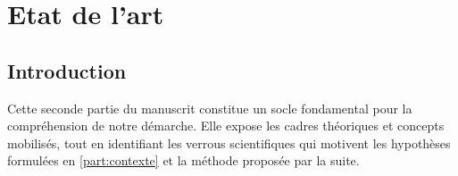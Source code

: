 \clearpage
\thispagestyle{empty}
\null
\newpage

\cleardoublepage
{}
\part{Etat de l'art}
\label{part:etat_art}

\clearpage
\thispagestyle{empty}
\null
\newpage


\chapter*{Introduction}

\noindent
Cette seconde partie du manuscrit constitue un socle fondamental pour la compréhension de notre démarche. Elle expose les cadres théoriques et concepts mobilisés, tout en identifiant les verrous scientifiques qui motivent les hypothèses formulées en \autoref{part:contexte} et la méthode proposée par la suite.

